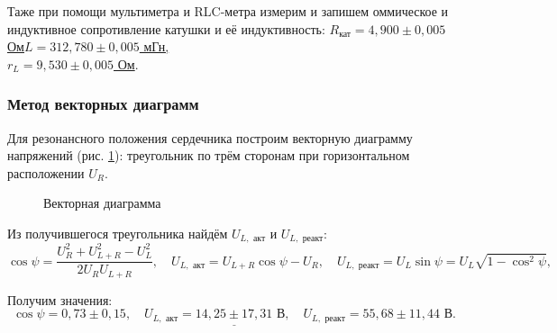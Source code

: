 \documentclass[a4paper,12pt]{article} %
\begin{document}
Таже при помощи мультиметра и RLC-метра измерим и запишем оммическое и индуктивное сопротивление катушки и её индуктивность: \underline{$ R_{\text{кат}} = 4,900 \pm 0,005 $ Ом$ L = 312,780 \pm 0,005 $ мГн,}
\\ \underline{$ r_L = 9,530 \pm 0,005 $ Ом}.

\subsubsection{Метод векторных диаграмм}

Для резонансного положения сердечника построим векторную диаграмму напряжений (рис. \ref{fig:image3}): треугольник по трём сторонам при горизонтальном расположении $ U_R $.

\begin{figure}[h]
	\caption{\centering Векторная диаграмма}
	\label{fig:image3}
\end{figure}

Из получившегося треугольника найдём $ U_{L,\text{ акт}} $ и $ U_{L,\text{ реакт}} $:
\begin{equation*}
\cos \psi  = \frac{{U_R^2 + U_{L + R}^2 - U_L^2}}{{2{U_R}{U_{L + R}}}}, \quad U_{L,\text{ акт}} = {U_{L + R}}\cos \psi  - {U_R}, \quad {U_{L,\text{ реакт}}} = {U_L}\sin \psi  = {U_L}\sqrt {1 - {{\cos }^2}\psi },
\end{equation*}

Получим значения:
\begin{equation}\label{eq:14t}
\underline{\cos \psi  = 0,73 \pm 0,15, \quad {U_{L,\text{ акт}}} = 14,25 \pm 17,31 \text{ В}, \quad {U_{L,\text{ реакт}}} = 55,68 \pm 11,44 \text{ В}.}
\end{equation}
\end{document}

